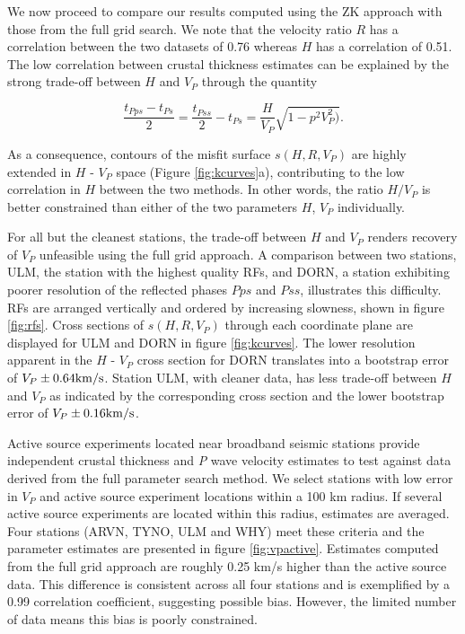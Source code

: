 \documentclass[msc,oneside]{ubcthesis}
\begin{document}
We now proceed to compare our results computed using the ZK approach with those from the full grid search. We note that the velocity ratio $R$ has a correlation between the two datasets of 0.76 whereas $H$ has a correlation of 0.51. The low correlation between crustal thickness estimates can be explained by the strong trade-off between $H$ and $V_P$ through the quantity

$$\frac{t_{Pps}-t_{Ps}}{2}=\frac{t_{Pss}}{2} - t_{Ps}= \frac{H}{V_P}\sqrt{1-p^2V^2_P)}.$$

\noindent As a consequence, contours of the misfit surface $s(H,R,V_P)$ are highly extended in $H$ - $V_P$ space (Figure \ref{fig:kcurves}a), contributing to the low correlation in $H$ between the two methods. In other words, the ratio $H/V_P$ is better constrained than either of the two parameters $H$, $V_P$ individually.

For all but the cleanest stations, the trade-off between $H$ and $V_P$ renders recovery of $V_P$ unfeasible using the full grid approach. A comparison between two stations, ULM, the station with the highest quality RFs, and DORN, a station exhibiting poorer resolution of the reflected phases $Pps$ and $Pss$, illustrates this difficulty. RFs are arranged vertically and ordered by increasing slowness, shown in figure \ref{fig:rfs}. Cross sections of $s(H,R,V_P)$ through each coordinate plane are displayed for ULM and DORN in figure \ref{fig:kcurves}. The lower resolution apparent in the $H$ - $V_P$ cross section for DORN translates into a bootstrap error of $V_P \pm 0.64 {\rm km/s}$. Station ULM, with cleaner data, has less trade-off between $H$ and $V_P$ as indicated by the corresponding cross section and the lower bootstrap error of $V_P \pm 0.16 {\rm km/s}$.

Active source experiments located near broadband seismic stations provide independent crustal thickness and {\it P} wave velocity estimates to test against data derived from the full parameter search method. We select stations with low error in $V_P$ and active source experiment locations within a 100 km radius. If several active source experiments are located within this radius, estimates are averaged. Four stations (ARVN, TYNO, ULM and WHY) meet these criteria and the parameter estimates are presented in figure \ref{fig:vpactive}. Estimates computed from the full grid approach are roughly 0.25 km/s higher than the active source data. This difference is consistent across all four stations and is exemplified by a 0.99 correlation coefficient, suggesting possible bias. However, the limited number of data means this bias is poorly constrained.
\end{document}
